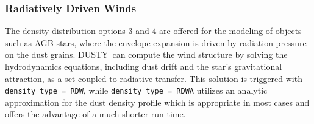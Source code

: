 \documentclass[11pt]{article}
\def\D  {{\sf DUSTY}}
\begin{document}
\subsubsection{Radiatively Driven Winds}
\label{winds}

The density distribution options 3 and 4 are offered for the modeling of
objects such as AGB stars, where the envelope expansion is driven by radiation
pressure on the dust grains. \D\ can compute the wind structure by solving the
hydrodynamics equations, including dust drift and the star's gravitational
attraction, as a set coupled to radiative transfer.  This solution is triggered
with {\tt density type = RDW}, while {\tt density type = RDWA} utilizes an
analytic approximation for the dust density profile which is appropriate in
most cases and offers the advantage of a much shorter run time.
\end{document}
